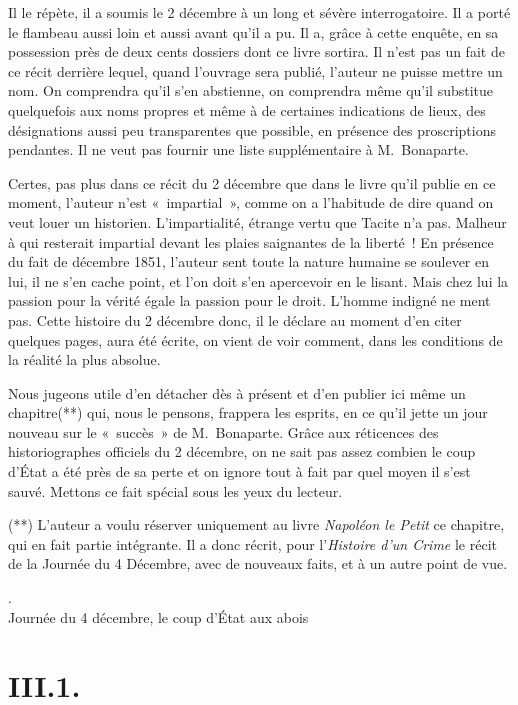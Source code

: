 \documentclass[french,twoside]{book} %
\begin{document}
{{ Il le répète, il a soumis le 2 décembre à un long et sévère interrogatoire. Il a porté le flambeau aussi loin et aussi avant qu’il a pu. Il a, grâce à cette enquête, en sa possession près de deux cents dossiers dont ce livre sortira. Il n’est pas un fait de ce récit derrière lequel, quand l’ouvrage sera publié, l’auteur ne puisse mettre un nom. On comprendra qu’il s’en abstienne, on comprendra même qu’il substitue quelquefois aux noms propres et même à de certaines indications de lieux, des désignations aussi peu transparentes que possible, en présence des proscriptions pendantes. Il ne veut pas fournir une liste supplémentaire à M. Bonaparte.\par
 Certes, pas plus dans ce récit du 2 décembre que dans le livre qu’il publie en ce moment, l’auteur n’est « impartial », comme on a l’habitude de dire quand on veut louer un historien. L’impartialité, étrange vertu que Tacite n’a pas. Malheur à qui resterait impartial devant les plaies saignantes de la liberté ! En présence du fait de décembre 1851, l’auteur sent toute la nature humaine se soulever en lui, il ne s’en cache point, et l’on doit s’en apercevoir en le lisant. Mais chez lui la passion pour la vérité égale la passion pour le droit. L’homme indigné ne ment pas. Cette histoire du 2 décembre donc, il le déclare au moment d’en citer quelques pages, aura été écrite, on vient de voir comment, dans les conditions de la réalité la plus absolue.\par
 Nous jugeons utile d’en détacher dès à présent et d’en publier ici même un chapitre(**) qui, nous le pensons, frappera les esprits, en ce qu’il jette un jour nouveau sur le « succès » de M. Bonaparte. Grâce aux réticences des historiographes officiels du 2 décembre, on ne sait pas assez combien le coup d’État a été près de sa perte et on ignore tout à fait par quel moyen il s’est sauvé. Mettons ce fait spécial sous les yeux du lecteur.\par
 (**) L’auteur a voulu réserver uniquement au livre \emph{Napoléon le Petit} ce chapitre, qui en fait partie intégrante. Il a donc récrit, pour l’\emph{Histoire d’un Crime} le récit de la Journée du 4 Décembre, avec de nouveaux faits, et à un autre point de vue.
}. \\
Journée du 4 décembre, le coup d’État aux abois}


\section[{III.1.}]{III.1.}
\end{document}
